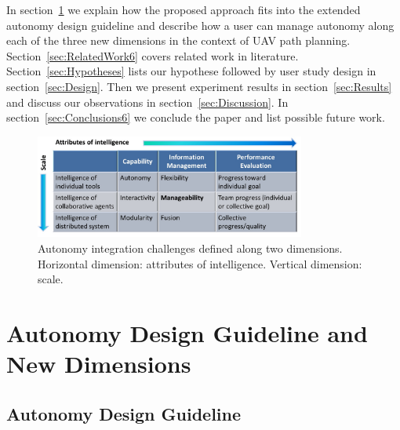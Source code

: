\documentclass[journal]{IEEEtran}
\begin{document}
In section~\ref{sec:dimensions} we explain how the proposed approach fits into the extended autonomy design guideline and describe how a user can manage autonomy along each of the three new dimensions in the context of UAV path planning. Section~\ref{sec:RelatedWork6} covers related work in literature. Section~\ref{sec:Hypotheses} lists our hypothese followed by user study design in section~\ref{sec:Design}. Then we present experiment results in section~\ref{sec:Results} and discuss our observations in section~\ref{sec:Discussion}. In section~\ref{sec:Conclusions6} we conclude the paper and list possible future work.

\begin{figure}
\centering
\includegraphics[width=3.5in]{IntegrationChallenges.JPG}
\caption{Autonomy integration challenges defined along two dimensions. Horizontal dimension: attributes of intelligence. Vertical dimension: scale.}
\label{IChallenges}
\end{figure}

\section{Autonomy Design Guideline and New Dimensions}
\label{sec:dimensions}

\subsection{Autonomy Design Guideline}
\end{document}
